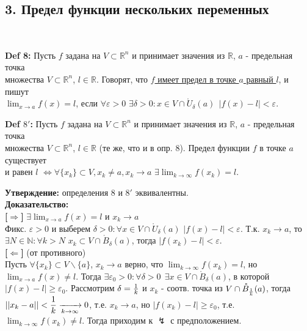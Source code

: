 \documentclass[book, 11pt]{report}
\begin{document}
        \subsection*{3. Предел функции нескольких переменных}
        \par{\ }
        \par{\textbf{Def 8: }Пусть $f$ задана на $V\subset\mathbb{R}^n$ и принимает значения из $\mathbb{R}$, $a$ - предельная точка \\ множества $V\subset\mathbb{R}^n$, $l\in\mathbb{R}$. Говорят, что \underline{$f$ имеет предел в точке $a$ равный $l$}, и пишут \\ $\displaystyle\lim_{x\to a}f(x)=l$, если $\forall\varepsilon>0$ $\exists\delta>0: x\in V\cap\mathring{U}_{\delta}(a) \ \ |f(x)-l|<\varepsilon$.}
        \vspace{0.3cm}
        \par{\textbf{Def $8'$: }Пусть $f$ задана на $V\subset\mathbb{R}^n$ и принимает значения из $\mathbb{R}$, $a$ - предельная точка \\ множества $V\subset\mathbb{R}^n$, $l\in\mathbb{R}$ (те же, что и в опр. 8). Предел функции $f$ в точке $a$ существует\\ и равен $l$ $\Leftrightarrow\forall\{x_k\}\subset V, x_k\ne a, x_k\to a$ $\displaystyle\exists\lim_{k\to\infty}f(x_k)=l$.}
        \vspace{0.3cm}
        \par{\textbf{Утверждение: }определения 8 и $8'$ эквивалентны.\\
        \textbf{Доказательство: } \\
        \textbf{[$\Rightarrow$]} $\displaystyle\exists\lim_{x\to a}f(x)=l$ и $x_k\to a$\\
        Фикс. $\varepsilon>0$ и выберем $\delta>0:\forall x\in V\cap\mathring{U}_{\delta}(a)$ $|f(x)-l|<\varepsilon$. Т.к. $x_k\to a$, то $\exists N\in\mathbb{N}:\forall k>N$ $x_k\subset V\cap\mathring{B}_{\delta}(a)$, тогда $|f(x_k)-l|<\varepsilon$.\\
        \textbf{[$\Leftarrow$]} (от противного)\\
        Пусть $\forall\{x_k\}\subset V\backslash\{a\}$, $x_k\to a$ верно, что $\displaystyle\lim_{k\to\infty}f(x_k)=l$, но $\displaystyle\lim_{x\to a}f(x)\ne l$. Тогда $\displaystyle\exists\varepsilon_0>0:\forall\delta>0 \ \ \exists x\in V\cap\mathring{B}_{\delta}(a)$, в которой $|f(x)-l|\geq\varepsilon_0$. Рассмотрим $\delta={1\over k}$ и $x_k$ - соотв. точка из $V\cap\mathring{B}_{1\over k}(a)$, тогда $\displaystyle||x_k-a||<{1\over k}\xrightarrow[k\to\infty]{}0$, т.е. $x_k\to a$, но $|f(x_k)-l|\geq\varepsilon_0$, т.е. $\displaystyle\lim_{k\to\infty}f(x_k)\ne l$. Тогда приходим к $\lightning$ с предположением.
        }
\end{document}
